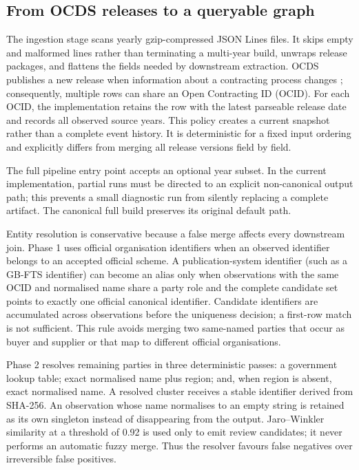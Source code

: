 \subsection{From OCDS releases to a queryable graph}
\label{sec:data-method}

The ingestion stage scans yearly gzip-compressed JSON Lines files.  It skips empty and malformed
lines rather than terminating a multi-year build, unwraps release packages, and flattens the
fields needed by downstream extraction.  OCDS publishes a new release when information about a
contracting process changes \citep{ocds-standard}; consequently, multiple rows can share an Open
Contracting ID (OCID).  For each OCID, the implementation retains the row with the latest
parseable release date and records all observed source years.  This policy creates a current
snapshot rather than a complete event history.  It is deterministic for a fixed input ordering
and explicitly differs from merging all release versions field by field.

The full pipeline entry point accepts an optional year subset.  In the current implementation,
partial runs must be directed to an explicit non-canonical output path; this prevents a small
diagnostic run from silently replacing a complete artifact.  The canonical full build preserves
its original default path.

Entity resolution is conservative because a false merge affects every downstream join.  Phase 1
uses official organisation identifiers when an observed identifier belongs to an accepted
official scheme.  A publication-system identifier (such as a GB-FTS identifier) can become an
alias only when observations with the same OCID and normalised name share a party role and the
complete candidate set points to exactly one official canonical identifier.  Candidate
identifiers are accumulated across observations before the uniqueness decision; a first-row
match is not sufficient.  This rule avoids merging two same-named parties that occur as buyer
and supplier or that map to different official organisations.

Phase 2 resolves remaining parties in three deterministic passes: a government lookup table;
exact normalised name plus region; and, when region is absent, exact normalised name.  A resolved
cluster receives a stable identifier derived from SHA-256.  An observation whose name
normalises to an empty string is retained as its own singleton instead of disappearing from the
output.  Jaro--Winkler similarity at a threshold of 0.92 is used only to emit review candidates;
it never performs an automatic fuzzy merge.  Thus the resolver favours false negatives over
irreversible false positives.

